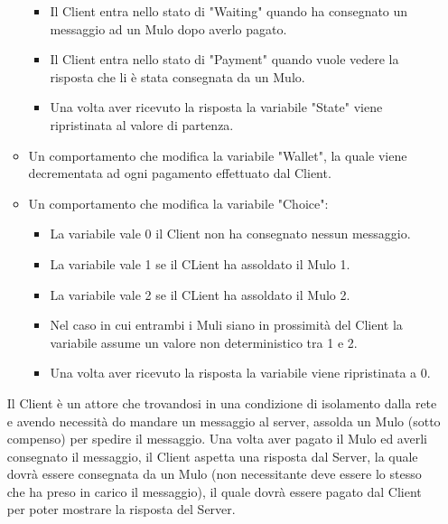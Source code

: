 \documentclass[13pt,a4paper]{article}
\begin{document}
\begin{itemize}
\begin{itemize}
\begin{itemize}
							\item Il Client entra nello stato di "Waiting" quando ha consegnato un messaggio ad un Mulo dopo averlo pagato. 
							\item Il Client entra nello stato di "Payment" quando vuole vedere la risposta che li è stata consegnata da un Mulo.
							\item Una volta aver ricevuto la risposta la variabile "State" viene ripristinata al valore di partenza.
							\end{itemize}
						\item Un comportamento che modifica la variabile "Wallet", la quale viene decrementata ad ogni pagamento effettuato dal Client.
						\item Un comportamento che modifica la variabile "Choice":
						\begin{itemize}
							\item La variabile vale 0 il Client non ha consegnato nessun messaggio.
							\item La variabile vale 1 se  il CLient ha assoldato il Mulo 1.
							\item La variabile vale 2 se  il CLient ha assoldato il Mulo 2.
							\item Nel caso in cui entrambi i Muli siano in prossimità del Client la variabile assume un valore non deterministico tra 1 e 2.
							\item Una volta aver ricevuto la risposta la variabile viene ripristinata a 0.
						\end{itemize}
					\end{itemize}
				Il Client  è un attore che trovandosi in una condizione di isolamento dalla rete e avendo necessità do mandare un messaggio al server, assolda un Mulo (sotto compenso) per spedire il messaggio. Una volta aver pagato il Mulo ed averli consegnato il messaggio, il Client aspetta una risposta dal Server, la quale dovrà essere consegnata da un Mulo (non necessitante deve essere lo stesso che ha preso in carico il messaggio), il quale dovrà essere pagato dal Client per poter mostrare la risposta del Server.
				

\end{itemize}
\end{document}
